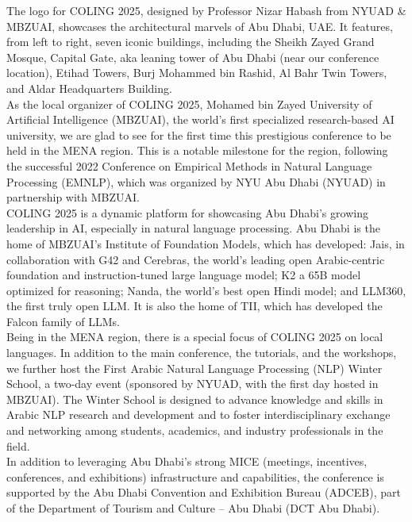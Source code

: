 The logo for COLING 2025, designed by Professor Nizar Habash from NYUAD \& MBZUAI, showcases the architectural marvels of Abu Dhabi, UAE. It features, from left to right, seven iconic buildings, including the Sheikh Zayed Grand Mosque, Capital Gate, aka leaning tower of Abu Dhabi (near our conference location), Etihad Towers, Burj Mohammed bin Rashid, Al Bahr Twin Towers, and Aldar Headquarters Building.\\

As the local organizer of COLING 2025, Mohamed bin Zayed University of Artificial Intelligence (MBZUAI), the world’s first specialized research-based AI university, we are glad to see for the first time this prestigious conference to be held in the MENA region. This is a notable milestone for the region, following the successful 2022 Conference on Empirical Methods in Natural Language Processing (EMNLP), which was organized by NYU Abu Dhabi (NYUAD) in partnership with MBZUAI.\\

COLING 2025 is a dynamic platform for showcasing Abu Dhabi’s growing leadership in AI, especially in natural language processing. Abu Dhabi is the home of MBZUAI’s Institute of Foundation Models, which has developed: Jais, in collaboration with G42 and Cerebras, the world’s leading open Arabic-centric foundation and instruction-tuned large language model; K2 a 65B model optimized for reasoning; Nanda, the world’s best open Hindi model; and LLM360, the first truly open LLM. It is also the home of TII, which has developed the Falcon family of LLMs.\\

Being in the MENA region, there is a special focus of COLING 2025 on local languages. In addition to the main conference, the tutorials, and the workshops, we further host the First Arabic Natural Language Processing (NLP) Winter School, a two-day event (sponsored by NYUAD, with the first day hosted in MBZUAI). The Winter School is designed to advance knowledge and skills in Arabic NLP research and development and to foster interdisciplinary exchange and networking among students, academics, and industry professionals in the field.\\

In addition to leveraging Abu Dhabi’s strong MICE (meetings, incentives, conferences, and exhibitions) infrastructure and capabilities, the conference is supported by the Abu Dhabi Convention and Exhibition Bureau (ADCEB), part of the Department of Tourism and Culture – Abu Dhabi (DCT Abu Dhabi).\\

